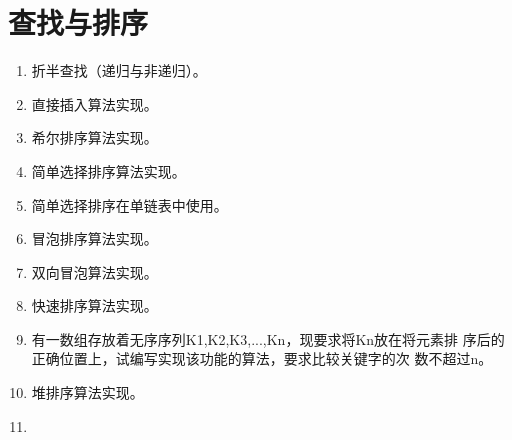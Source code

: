 \documentclass[lang=cn,newtx,10pt,scheme=chinese]{../../elegantbook}
\begin{document}
\chapter{查找与排序}

\begin{enumerate}
\def\labelenumi{\arabic{enumi}.}
\item
  
  折半查找（递归与非递归）。
  
\vspace{5cm}
\item
  
  直接插入算法实现。
  
\vspace{5cm}
\item
  
  希尔排序算法实现。
  
\vspace{5cm}
\item
  
  简单选择排序算法实现。
  
\vspace{5cm}
\item
  
  简单选择排序在单链表中使用。
  
\vspace{5cm}
\item
  
  冒泡排序算法实现。
  
\vspace{5cm}
\item
  
  双向冒泡算法实现。
  
\vspace{5cm}
\item
  
  快速排序算法实现。
  
\vspace{5cm}
\item
  
  有一数组存放着无序序列K1,K2,K3,...,Kn，现要求将Kn放在将元素排
  序后的正确位置上，试编写实现该功能的算法，要求比较关键字的次
  数不超过n。
  
\vspace{5cm}
\item
  
  堆排序算法实现。
  
\vspace{5cm}
\item
  

\end{enumerate}
\end{document}
